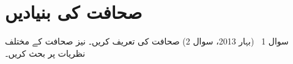 %

\section*{صحافت کی بنیادیں}

\begin{sawal}{سوال \textenglish{1} \ \textnormal{\small(بہار \textenglish{2013}، سوال \textenglish{2})}}
صحافت کی تعریف کریں۔ نیز صحافت کے مختلف نظریات پر بحث کریں۔
\end{sawal}

